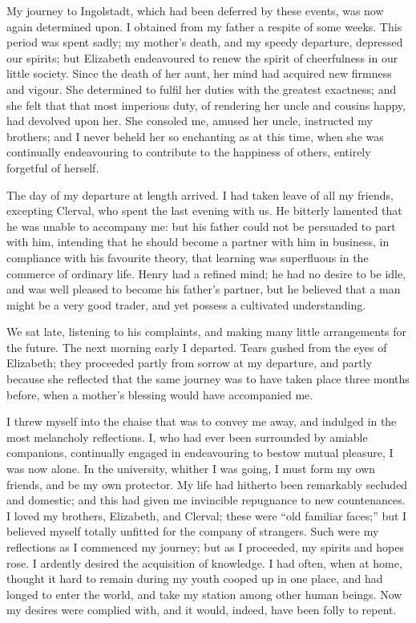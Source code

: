 My journey to Ingolstadt, which had
been deferred by these events, was now
again determined upon. I obtained
from my father a respite of some weeks.
This period was spent sadly; my mother's
death, and my speedy departure,
depressed our spirits; but Elizabeth
endeavoured to renew the spirit of
cheerfulness in our little society. Since
the death of her aunt, her mind had
acquired new firmness and vigour. She
determined to fulfil her duties with the
greatest exactness; and she felt that
that most imperious duty, of rendering
her uncle and cousins happy, had devolved
upon her. She consoled me,
amused her uncle, instructed my brothers;
and I never beheld her so enchanting
as at this time, when she
was continually endeavouring to contribute
to the happiness of others, entirely
forgetful of herself.

The day of my departure at length
arrived. I had taken leave of all my
friends, excepting Clerval, who spent
the last evening with us. He bitterly
lamented that he was unable to accompany
me: but his father could not be
persuaded to part with him, intending
that he should become a partner with
him in business, in compliance with
his favourite theory, that learning
was superfluous in the commerce of
ordinary life. Henry had a refined
mind; he had no desire to be idle, and
was well pleased to become his father's
partner, but he believed that a man
might be a very good trader, and yet
possess a cultivated understanding.

We sat late, listening to his complaints,
and making many little arrangements
for the future. The next
morning early I departed. Tears
gushed from the eyes of Elizabeth;
they proceeded partly from sorrow at
my departure, and partly because she
reflected that the same journey was to
have taken place three months before,
when a mother's blessing would have
accompanied me.

I threw myself into the chaise that
was to convey me away, and indulged
in the most melancholy reflections. I,
who had ever been surrounded by amiable
companions, continually engaged
in endeavouring to bestow mutual
pleasure, I was now alone. In the university,
whither I was going, I must form
my own friends, and be my own protector.
My life had hitherto been remarkably
secluded and domestic; and
this had given me invincible repugnance
to new countenances. I loved
my brothers, Elizabeth, and Clerval;
these were ``old familiar faces;'' but I
believed myself totally unfitted for the
company of strangers. Such were my
reflections as I commenced my journey;
but as I proceeded, my spirits and hopes
rose. I ardently desired the acquisition
of knowledge. I had often, when
at home, thought it hard to remain
during my youth cooped up in one
place, and had longed to enter the
world, and take my station among other
human beings. Now my desires were
complied with, and it would, indeed,
have been folly to repent.

